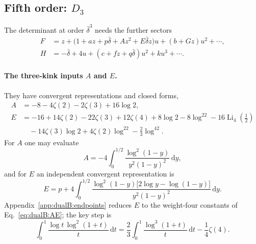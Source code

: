 \documentclass[11pt,a4paper]{article}
\numberwithin{equation}{section}
\newcommand{\dd}{\,\mathrm d}
\newcommand{\db}{\bar\delta}
\newcommand{\Li}{\operatorname{Li}}
\begin{document}
\subsection{Fifth order: \texorpdfstring{$D_3$}{D3}}\label{app:dualB:D3}
The determinant at order $\db^3$ needs the further sectors
\begin{equation}
\begin{aligned}
 F&=z+\bigl(1+az+p\db+Az^2+E\db z\bigr)u+(b+Gz)u^2+\cdots,\\
 H&=-\db+4u+(c+fz+q\db)u^2+ku^3+\cdots.
\end{aligned}
\label{eq:dualB:beta3}
\end{equation}

\paragraph{The three-kink inputs $A$ and $E$.} They have convergent representations and closed forms,
\begin{equation}
\begin{aligned}
 A&=-8-4\zeta(2)-2\zeta(3)+16\log2,\\
 E&=-16+14\zeta(2)-22\zeta(3)+12\zeta(4)+8\log2-8\log^22-16\Li_4(\tfrac12)\\
 &\quad-14\zeta(3)\log2+4\zeta(2)\log^22-\tfrac23\log^42.
\end{aligned}
\label{eq:dualB:AE}
\end{equation}
For $A$ one may evaluate
\begin{equation}
 A=-4\int_0^{1/2}\frac{\log^2(1-y)}{y^2(1-y)^2}\dd y,
\end{equation}
and for $E$ an independent convergent representation is
\begin{equation}
 E=p+4\int_0^{1/2}\frac{\log^2(1-y)\bigl[2\log y-\log(1-y)\bigr]}{y^2(1-y)^2}\dd y.
 \label{eq:dualB:Erep}
\end{equation}
Appendix~\ref{app:dualB:endpoints} reduces $E$ to the weight-four constants of Eq.~\eqref{eq:dualB:AE}; the key step is
\begin{equation}
 \int_0^1\frac{\log t\,\log^2(1+t)}{t}\dd t=\frac23\int_0^1\frac{\log^3(1+t)}{t}\dd t-\frac14\zeta(4).
\end{equation}
\end{document}
